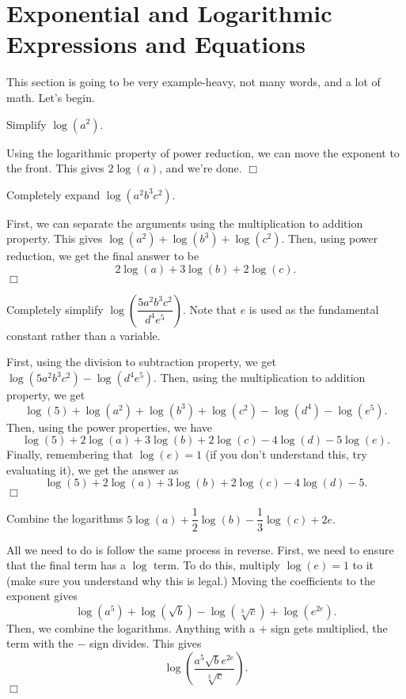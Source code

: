 \documentclass[lang=en,11pt]{elegantbook}
\begin{document}
\section{Exponential and Logarithmic Expressions and Equations}
\noindent This section is going to be very example-heavy, not many words, and a lot of math.  Let's begin.
\begin{example}
Simplify $\log(a^2)$.
\end{example}
\begin{solution}
Using the logarithmic property of power reduction, we can move the exponent to the front.  This gives $2\log(a)$, and we're done. $\Box$
\end{solution}
\begin{example}
Completely expand $\log(a^2b^3c^2)$.
\end{example}
\begin{solution}
First, we can separate the arguments using the multiplication to addition property.  This gives $\log(a^2)+\log(b^3)+\log(c^2)$.  Then, using power reduction, we get the final answer to be $$2\log(a)+3\log(b)+2\log(c).$$ $\Box$
\end{solution}
\begin{example}
Completely simplify $\log\left(\dfrac{5a^2b^3c^2}{d^4e^5}\right)$.  Note that $e$ is used as the fundamental constant rather than a variable.
\end{example}
\begin{solution}
First, using the division to subtraction property, we get $\log(5a^2b^3c^2)-\log(d^4e^5)$.  Then, using the multiplication to addition property, we get $$\log(5)+\log(a^2)+\log(b^3)+\log(c^2)-\log(d^4)-\log(e^5).$$  Then, using the power properties, we have $$\log(5)+2\log(a)+3\log(b)+2\log(c)-4\log(d)-5\log(e).$$  Finally, remembering that $\log(e)=1$ (if you don't understand this, try evaluating it), we get the answer as $$\log(5)+2\log(a)+3\log(b)+2\log(c)-4\log(d)-5.$$ $\Box$
\end{solution}
\begin{example}
Combine the logarithms $5\log(a)+\dfrac{1}{2}\log(b)-\dfrac{1}{3}\log(c)+2e.$
\end{example}
\begin{solution}
All we need to do is follow the same process in reverse.  First, we need to ensure that the final term has a $\log$ term.  To do this, multiply $\log(e)=1$ to it (make sure you understand why this is legal.) Moving the coefficients to the exponent gives $$\log(a^5)+\log(\sqrt{b})-\log(\sqrt[3]{c})+\log(e^{2e}).$$ Then, we combine the logarithms.  Anything with a $+$ sign gets multiplied, the term with the $-$ sign divides.  This gives $$\log\left(\dfrac{a^5\sqrt{b}e^{2e}}{\sqrt[3]{c}}\right).$$ $\Box$
\end{solution}
\end{document}
